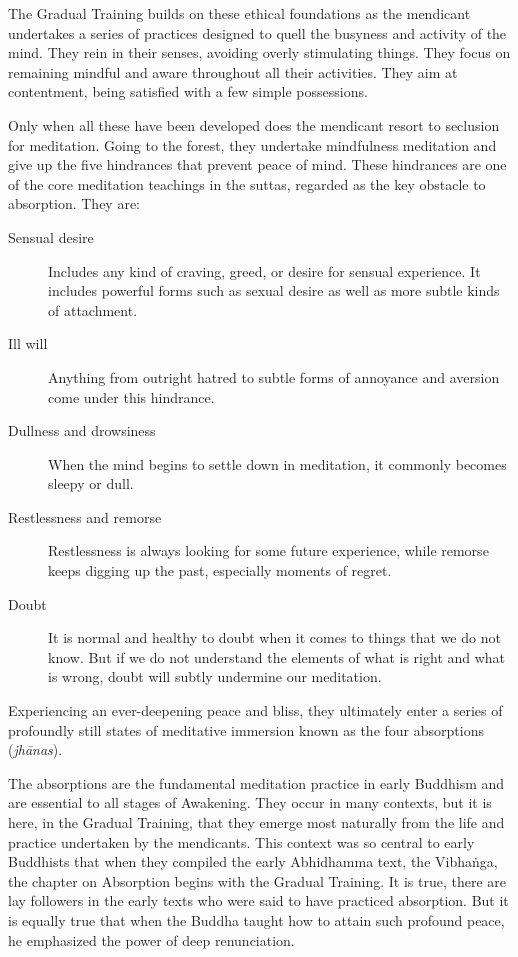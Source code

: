 \documentclass[12pt,openany]{book}%
\begin{document}
The Gradual Training builds on these ethical foundations as the mendicant undertakes a series of practices designed to quell the busyness and activity of the mind. They rein in their senses, avoiding overly stimulating things. They focus on remaining mindful and aware throughout all their activities. They aim at contentment, being satisfied with a few simple possessions.

Only when all these have been developed does the mendicant resort to seclusion for meditation. Going to the forest, they undertake mindfulness meditation and give up the five hindrances that prevent peace of mind. These hindrances are one of the core meditation teachings in the suttas, regarded as the key obstacle to absorption. They are:

\begin{description}%
\item[Sensual desire] Includes any kind of craving, greed, or desire for sensual experience. It includes powerful forms such as sexual desire as well as more subtle kinds of attachment.%
\item[Ill will] Anything from outright hatred to subtle forms of annoyance and aversion come under this hindrance.%
\item[Dullness and drowsiness] When the mind begins to settle down in meditation, it commonly becomes sleepy or dull.%
\item[Restlessness and remorse] Restlessness is always looking for some future experience, while remorse keeps digging up the past, especially moments of regret.%
\item[Doubt] It is normal and healthy to doubt when it comes to things that we do not know. But if we do not understand the elements of what is right and what is wrong, doubt will subtly undermine our meditation.%
\end{description}

Experiencing an ever-deepening peace and bliss, they ultimately enter a series of profoundly still states of meditative immersion known as the four absorptions (\textit{\textsanskrit{jhānas}}).

The absorptions are the fundamental meditation practice in early Buddhism and are essential to all stages of Awakening. They occur in many contexts, but it is here, in the Gradual Training, that they emerge most naturally from the life and practice undertaken by the mendicants. This context was so central to early Buddhists that when they compiled the early Abhidhamma text, the \textsanskrit{Vibhaṅga}, the chapter on Absorption begins with the Gradual Training. It is true, there are lay followers in the early texts who were said to have practiced absorption. But it is equally true that when the Buddha taught how to attain such profound peace, he emphasized the power of deep renunciation.
\end{document}
